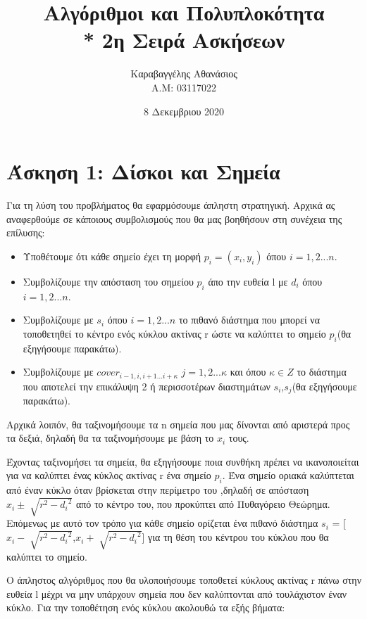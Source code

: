 \documentclass[12pt,a4paper]{article}
\title{Αλγόριθμοι και Πολυπλοκότητα \\* 2η Σειρά Ασκήσεων}
\author{ Καραβαγγέλης Αθανάσιος \\ Α.Μ: 03117022}
\date{8 Δεκεμβριου 2020}
\begin{document}
\maketitle
\newpage

\section*{Άσκηση 1: Δίσκοι και Σημεία} 


Για τη λύση του προβλήματος θα εφαρμόσουμε άπληστη στρατηγική. Αρχικά ας αναφερθούμε σε κάποιους συμβολισμούς που θα μας βοηθήσουν στη συνέχεια της επίλυσης:
\begin{itemize}
    \item Υποθέτουμε ότι κάθε σημείο έχει τη μορφή $p_i = (x_i,y_i)$ όπου $i = 1,2...n$.
    \item Συμβολίζουμε την απόσταση του σημείου $p_i$ άπο την ευθεία l με $d_i$ όπου $i = 1,2...n$.
    \item Συμβολίζουμε με $s_{i}$ όπου $i = 1,2...n$ το πιθανό διάστημα που μπορεί να τοποθετηθεί το κέντρο ενός κύκλου ακτίνας r ώστε να καλύπτει το σημείο $p_i$(θα εξηγήσουμε παρακάτω).
    \item Συμβολίζουμε με $cover_{i-1,i,i+1...i+κ}$ $j=1,2...κ $ και όπου 
    $κ \in Z$  το διάστημα που αποτελεί την επικάλυψη 2 ή περισσοτέρων διαστημάτων $s_i$,$s_j$(θα εξηγήσουμε παρακάτω).
\end{itemize}
Αρχικά λοιπόν, θα ταξινομήσουμε τα n σημεία που μας δίνονται από αριστερά προς τα δεξιά, δηλαδή θα τα ταξινομήσουμε με βάση το $x_i$ τους.\par
Έχοντας ταξινομήσει τα σημεία, θα εξηγήσουμε ποια συνθήκη πρέπει να ικανοποιείται για να καλύπτει ένας κύκλος ακτίνας r ένα σημείο $p_i$. Ένα σημείο οριακά καλύπτεται από έναν κύκλο όταν βρίσκεται στην περίμετρο του ,δηλαδή σε απόσταση $x_i \pm \sqrt[]{r^2 - {d_i}^2}$ από το κέντρο του, που προκύπτει από Πυθαγόρειο Θεώρημα. Επόμενως με αυτό τον τρόπο για κάθε σημείο ορίζεται ένα πιθανό διάστημα $s_i$ = [$x_i - \sqrt[]{r^2 - {d_i}^2}$,$x_i + \sqrt[]{r^2 - {d_i}^2}$] για τη θέση του κέντρου του κύκλου που θα καλύπτει το σημείο. \\ \par
Ο άπληστος αλγόριθμος που θα υλοποιήσουμε τοποθετεί κύκλους ακτίνας r πάνω στην ευθεία l μέχρι να μην υπάρχουν σημεία που δεν καλύπτονται από τουλάχιστον έναν κύκλο.
Για την τοποθέτηση ενός κύκλου ακολουθώ τα εξής βήματα: 
\end{document}
